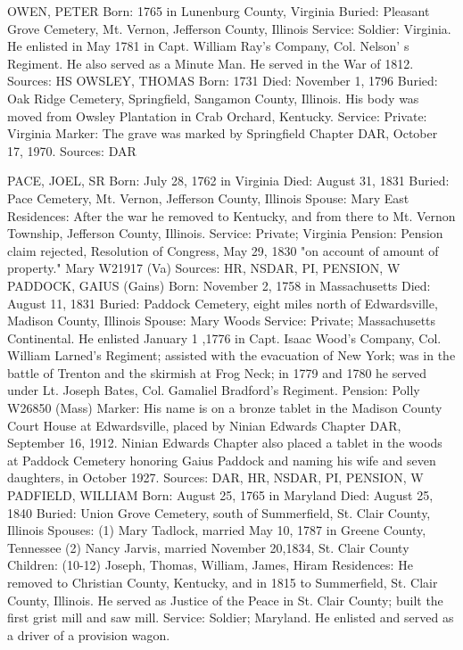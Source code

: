 OWEN, PETER
Born: 1765 in Lunenburg County, Virginia 
Buried: Pleasant Grove Cemetery, Mt. Vernon, Jefferson County, Illinois 
Service: Soldier: Virginia. He enlisted in May 1781 in Capt. William Ray's Com­pany, Col. Nelson' s Regiment. He also served as a Minute Man. He served in the War of 1812. Sources: HS 
OWSLEY, THOMAS
Born: 1731
Died: November 1, 1796 
Buried: Oak Ridge Cemetery, Springfield, Sangamon County, Illinois. His body was moved from Owsley Plantation in Crab Orchard, Kentucky. 
Service: Private: Virginia
Marker: The grave was marked by Springfield Chapter DAR, October 17, 1970. 
Sources: DAR 


PACE, JOEL, SR
Born: July 28, 1762 in Virginia 
Died: August 31, 1831
Buried: Pace Cemetery, Mt. Vernon, Jefferson County, Illinois 
Spouse: Mary East
Residences: After the war he removed to Kentucky, and from there to Mt. Vernon Township, Jefferson County, Illinois. 
Service: Private; Virginia Pension: Pension claim rejected, Resolution of Congress, May 29, 1830 "on account of amount of property." Mary W21917 (Va) 
Sources: HR, NSDAR, PI, PENSION, W 
PADDOCK, GAIUS (Gains) 
Born: November 2, 1758 in Massachusetts 
Died: August 11, 1831
Buried: Paddock Cemetery, eight miles north of Edwardsville, Madison County, Illinois Spouse: Mary Woods 
Service: Private; Massachusetts Continental. He enlisted January 1 ,1776 in Capt. Isaac Wood's Company, Col. William Larned's Regiment; assisted with the evacuation of New York; was in the battle of Trenton and the skirmish at Frog Neck; in 1779 and 1780 he served under Lt. Joseph Bates, Col. Gamaliel Bradford's Regiment. 
Pension: Polly W26850 (Mass) 
Marker: His name is on a bronze tablet in the Madison County Court House at Edwardsville, placed by Ninian Edwards Chapter DAR, September 16, 1912.  Ninian Edwards Chapter also placed a tablet in the woods at Paddock Cemetery honoring Gaius Paddock and naming his wife and seven daughters, in October 1927. 
Sources: DAR, HR, NSDAR, PI, PENSION, W 
PADFIELD, WILLIAM 
Born: August 25, 1765 in Maryland
Died: August 25, 1840 
Buried: Union Grove Cemetery, south of Summerfield, St. Clair County, Illinois 
Spouses:	(1) Mary Tadlock, married May 10, 1787 in Greene County, Tennessee
	(2) Nancy Jarvis, married November 20,1834, St. Clair County 
Children: 	(10-12) Joseph, Thomas, William, James, Hiram 
Residences: He removed to Christian County, Kentucky, and in 1815 to Summer­field, St. Clair County, Illinois. He served as Justice of the Peace in St. Clair County; built the first grist mill and saw mill. 
Service: Soldier; Maryland. He enlisted and served as a driver of a provision wagon. 
